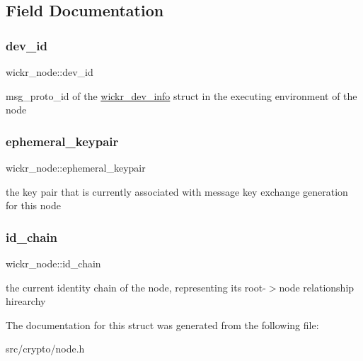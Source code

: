\subsection{Field Documentation}
\mbox{\label{structwickr__node_a564e42fc1d4b63353d74e5fbf0bead82}} 
\subsubsection{\texorpdfstring{dev\+\_\+id}{dev\_id}}
{\footnotesize\ttfamily wickr\+\_\+node\+::dev\+\_\+id}

msg\+\_\+proto\+\_\+id of the \textquotesingle{}\hyperlink{structwickr__dev__info}{wickr\+\_\+dev\+\_\+info}\textquotesingle{} struct in the executing environment of the node \mbox{\label{structwickr__node_a628b61eed5cb17b831ff687143393b93}} 
\subsubsection{\texorpdfstring{ephemeral\+\_\+keypair}{ephemeral\_keypair}}
{\footnotesize\ttfamily wickr\+\_\+node\+::ephemeral\+\_\+keypair}

the key pair that is currently associated with message key exchange generation for this node \mbox{\label{structwickr__node_a3a5100ed26ae534e2070623713aacfde}} 
\subsubsection{\texorpdfstring{id\+\_\+chain}{id\_chain}}
{\footnotesize\ttfamily wickr\+\_\+node\+::id\+\_\+chain}

the current identity chain of the node, representing its root-\/$>$node relationship hirearchy 

The documentation for this struct was generated from the following file\+:\begin{DoxyCompactItemize}
\item 
src/crypto/node.\+h\end{DoxyCompactItemize}

